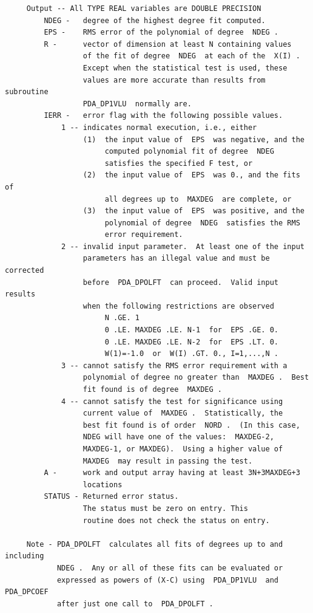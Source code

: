 \documentclass[11pt,twoside]{article}
\begin{document}
\begin{verbatim}
     Output -- All TYPE REAL variables are DOUBLE PRECISION
         NDEG -   degree of the highest degree fit computed.
         EPS -    RMS error of the polynomial of degree  NDEG .
         R -      vector of dimension at least N containing values
                  of the fit of degree  NDEG  at each of the  X(I) .
                  Except when the statistical test is used, these
                  values are more accurate than results from subroutine
                  PDA_DP1VLU  normally are.
         IERR -   error flag with the following possible values.
             1 -- indicates normal execution, i.e., either
                  (1)  the input value of  EPS  was negative, and the
                       computed polynomial fit of degree  NDEG
                       satisfies the specified F test, or
                  (2)  the input value of  EPS  was 0., and the fits of
                       all degrees up to  MAXDEG  are complete, or
                  (3)  the input value of  EPS  was positive, and the
                       polynomial of degree  NDEG  satisfies the RMS
                       error requirement.
             2 -- invalid input parameter.  At least one of the input
                  parameters has an illegal value and must be corrected
                  before  PDA_DPOLFT  can proceed.  Valid input results
                  when the following restrictions are observed
                       N .GE. 1
                       0 .LE. MAXDEG .LE. N-1  for  EPS .GE. 0.
                       0 .LE. MAXDEG .LE. N-2  for  EPS .LT. 0.
                       W(1)=-1.0  or  W(I) .GT. 0., I=1,...,N .
             3 -- cannot satisfy the RMS error requirement with a
                  polynomial of degree no greater than  MAXDEG .  Best
                  fit found is of degree  MAXDEG .
             4 -- cannot satisfy the test for significance using
                  current value of  MAXDEG .  Statistically, the
                  best fit found is of order  NORD .  (In this case,
                  NDEG will have one of the values:  MAXDEG-2,
                  MAXDEG-1, or MAXDEG).  Using a higher value of
                  MAXDEG  may result in passing the test.
         A -      work and output array having at least 3N+3MAXDEG+3
                  locations
         STATUS - Returned error status.
                  The status must be zero on entry. This
                  routine does not check the status on entry.

     Note - PDA_DPOLFT  calculates all fits of degrees up to and including
            NDEG .  Any or all of these fits can be evaluated or
            expressed as powers of (X-C) using  PDA_DP1VLU  and  PDA_DPCOEF
            after just one call to  PDA_DPOLFT .


\end{verbatim}
\end{document}
